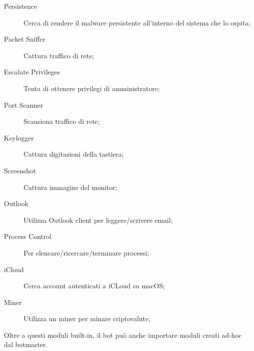 \begin{description}
    \item [Persistence] Cerca di rendere il malware persistente all'interno del sistema che lo ospita;
    \item [Packet Sniffer] Cattura traffico di rete;
    \item [Escalate Privileges] Tenta di ottenere privilegi di amministratore;
    \item [Port Scanner] Scansiona traffico di rete;
    \item [Keylogger] Cattura digitazioni della tastiera;
    \item [Screenshot] Cattura immagine del monitor;
    \item [Outlook] Utilizza Outlook client per leggere/scrivere email;
    \item [Process Control] Per elencare/ricercare/terminare processi;
    \item [iCloud] Cerca account autenticati a iCLoud su macOS;
    \item [Miner] Utilizza un miner per minare criptovalute;
\end{description}

Oltre a questi moduli built-in, il bot può anche importare moduli creati ad-hoc dal botmaster.




